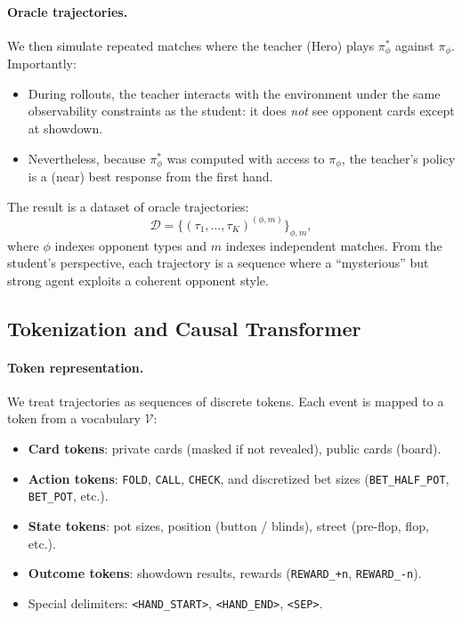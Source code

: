 \documentclass{article}
\begin{document}
\paragraph{Oracle trajectories.}
We then simulate repeated matches where the teacher (Hero) plays $\pi^*_{\phi}$ against $\pi_{\phi}$. Importantly:
\begin{itemize}[leftmargin=*]
    \item During rollouts, the teacher interacts with the environment under the same observability constraints as the student: it does \emph{not} see opponent cards except at showdown.
    \item Nevertheless, because $\pi^*_{\phi}$ was computed with access to $\pi_{\phi}$, the teacher's policy is a (near) best response from the first hand.
\end{itemize}
The result is a dataset of oracle trajectories:
\begin{equation}
    \mathcal{D} = \{ (\tau_1,\dots,\tau_K)^{(\phi,m)} \}_{\phi,m},
\end{equation}
where $\phi$ indexes opponent types and $m$ indexes independent matches. From the student's perspective, each trajectory is a sequence where a ``mysterious'' but strong agent exploits a coherent opponent style.

\subsection{Tokenization and Causal Transformer}
\label{sec:tokenization}

\paragraph{Token representation.}
We treat trajectories as sequences of discrete tokens. Each event is mapped to a token from a vocabulary $\mathcal{V}$:
\begin{itemize}[leftmargin=*]
    \item \textbf{Card tokens}: private cards (masked if not revealed), public cards (board).
    \item \textbf{Action tokens}: \texttt{FOLD}, \texttt{CALL}, \texttt{CHECK}, and discretized bet sizes (\texttt{BET\_HALF\_POT}, \texttt{BET\_POT}, etc.).
    \item \textbf{State tokens}: pot sizes, position (button / blinds), street (pre-flop, flop, etc.).
    \item \textbf{Outcome tokens}: showdown results, rewards (\texttt{REWARD\_+n}, \texttt{REWARD\_-n}).
    \item Special delimiters: \texttt{<HAND\_START>}, \texttt{<HAND\_END>}, \texttt{<SEP>}.
\end{itemize}
\end{document}
